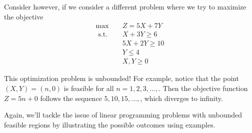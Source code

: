 Consider however, if we consider a different problem where we try to maximize the objective
\begin{align*}
\max \quad & Z = 5X + 7Y\\ 
\text { s.t. } \quad & X+3 Y \geq 6 \\ 
&5 X+ 2 Y \geq 10 \\ 
&Y  \leq 4 \\ 
&X, Y  \geq 0 
\end{align*}

\begin{solution}
This optimization problem is unbounded!  For example, notice that the point $(X,Y) = (n,0)$ is feasible for all $n=1,2,3,\dots,$.   Then the objective function $Z = 5n + 0$ follows the sequence $5, 10, 15, \dots,$, which diverges to infinity.   
\end{solution}


Again, we'll tackle the issue of linear programming problems with unbounded feasible regions by illustrating the possible outcomes using examples.

